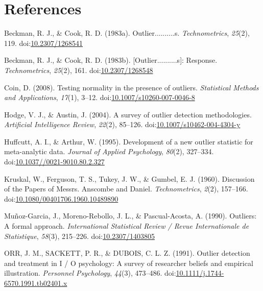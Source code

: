 \documentclass[english,man]{apa6}
\theoremstyle{definition}
\theoremstyle{definition}
\theoremstyle{definition}
\theoremstyle{remark}
\begin{document}
\newpage

\section{References}\label{references}

\setlength{\parindent}{-0.5in} \setlength{\leftskip}{0.5in}

\hypertarget{refs}{}
\hypertarget{ref-Beckman1983a}{}
Beckman, R. J., \& Cook, R. D. (1983a). Outlier..........s.
\emph{Technometrics}, \emph{25}(2), 119.
doi:\href{https://doi.org/10.2307/1268541}{10.2307/1268541}

\hypertarget{ref-Beckman1983}{}
Beckman, R. J., \& Cook, R. D. (1983b). {[}Outlier..........s{]}:
Response. \emph{Technometrics}, \emph{25}(2), 161.
doi:\href{https://doi.org/10.2307/1268548}{10.2307/1268548}

\hypertarget{ref-Coin2008}{}
Coin, D. (2008). Testing normality in the presence of outliers.
\emph{Statistical Methods and Applications}, \emph{17}(1), 3--12.
doi:\href{https://doi.org/10.1007/s10260-007-0046-8}{10.1007/s10260-007-0046-8}

\hypertarget{ref-Hodge2004}{}
Hodge, V. J., \& Austin, J. (2004). A survey of outlier detection
methodologies. \emph{Artificial Intelligence Review}, \emph{22}(2),
85--126.
doi:\href{https://doi.org/10.1007/s10462-004-4304-y}{10.1007/s10462-004-4304-y}

\hypertarget{ref-Huffcutt1995}{}
Huffcutt, A. I., \& Arthur, W. (1995). Development of a new outlier
statistic for meta-analytic data. \emph{Journal of Applied Psychology},
\emph{80}(2), 327--334.
doi:\href{https://doi.org/10.1037//0021-9010.80.2.327}{10.1037//0021-9010.80.2.327}

\hypertarget{ref-Kruskal1960a}{}
Kruskal, W., Ferguson, T. S., Tukey, J. W., \& Gumbel, E. J. (1960).
Discussion of the Papers of Messrs. Anscombe and Daniel.
\emph{Technometrics}, \emph{2}(2), 157--166.
doi:\href{https://doi.org/10.1080/00401706.1960.10489890}{10.1080/00401706.1960.10489890}

\hypertarget{ref-Munoz-Garcia1990}{}
Muñoz-Garcia, J., Moreno-Rebollo, J. L., \& Pascual-Acosta, A. (1990).
Outliers: A formal approach. \emph{International Statistical Review /
Revue Internationale de Statistique}, \emph{58}(3), 215--226.
doi:\href{https://doi.org/10.2307/1403805}{10.2307/1403805}

\hypertarget{ref-ORR1991}{}
ORR, J. M., SACKETT, P. R., \& DUBOIS, C. L. Z. (1991). Outlier
detection and treatment in I / O psychology: A survey of researcher
beliefs and empirical illustration. \emph{Personnel Psychology},
\emph{44}(3), 473--486.
doi:\href{https://doi.org/10.1111/j.1744-6570.1991.tb02401.x}{10.1111/j.1744-6570.1991.tb02401.x}
\end{document}
